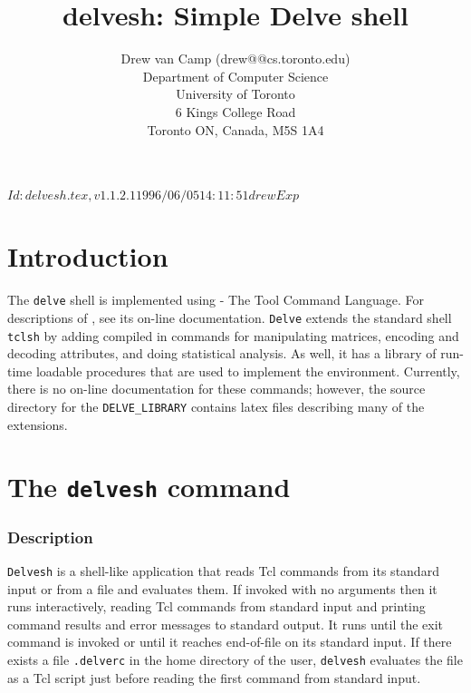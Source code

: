 \documentclass{article}
\newcommand{\delvesh}{\texttt{delvesh}}
\begin{document}
\rcsInfo $Id: delvesh.tex,v 1.1.2.1 1996/06/05 14:11:51 drew Exp $

\title{delvesh: Simple Delve shell}
\author{Drew van Camp (drew@@cs.toronto.edu)\\[1ex]
	Department of Computer Science\\
	University of Toronto\\
	6 Kings College Road\\
	Toronto ON, Canada, M5S 1A4}

\vfil
\maketitle
\vfil
{}
\vfil
\clearpage

\section{Introduction}

The \texttt{delve} shell is implemented using \tcl{} - The Tool
Command Language.  For descriptions of \tcl{}, see its on-line
documentation.  \texttt{Delve} extends the standard \tcl{} shell
\texttt{tclsh} by adding compiled in commands for manipulating matrices,
encoding and decoding attributes, and doing statistical analysis.  As
well, it has a library of run-time loadable procedures that are used
to implement the \delve{} environment.  Currently, there is no on-line
documentation for these commands; however, the source directory for
the \texttt{DELVE\_LIBRARY} contains latex files describing many of
the extensions.

\section{The \texttt{delvesh} command}
\subsubsection{Description}
\texttt{Delvesh} is a shell-like application that reads Tcl commands from its
standard input or from a file and evaluates them.  If invoked with no
arguments then it runs interactively, reading Tcl commands from
standard input and printing command results and error messages to
standard output.  It runs until the exit command is invoked or until
it reaches end-of-file on its standard input.  If there exists a file
\texttt{.delverc} in the home directory of the user, \delvesh{}
evaluates the file as a Tcl script just before reading the first
command from standard input.
\end{document}
